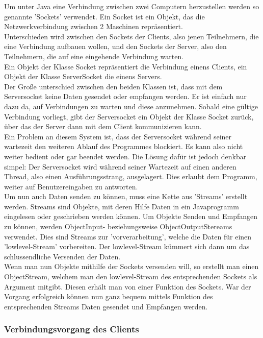 \documentclass[12pt,a4paper]{article}
\begin{document}
{Um unter Java eine Verbindung zwischen zwei Computern herzustellen werden so genannte 'Sockets' verwendet. Ein Socket ist ein Objekt, das die Netzwerkverbindung zwischen 2 Maschinen repräsentiert.\\
Unterschieden wird zwischen den Sockets der Clients, also jenen Teilnehmern, die eine Verbindung aufbauen wollen, und den Sockets der Server, also den Teilnehmern, die auf eine eingehende Verbindung warten.\\
Ein Objekt der Klasse Socket repräsentiert die Verbindung einens Clients, ein Objekt der Klasse ServerSocket die einens Servers.\\
Der Große unterschied zwischen den beiden Klassen ist, dass mit dem Serversocket keine Daten gesendet oder empfangen werden. Er ist einfach nur dazu da, auf  Verbindungen zu warten und diese anzunehmen. Sobald eine gültige Verbindung vorliegt, gibt der Serversocket ein Objekt der Klasse Socket zurück, über das der Server dann mit dem Client kommunizieren kann.\\[2ex]
Ein Problem an diesem System ist, dass der Serversocket während seiner wartezeit den weiteren Ablauf des Programmes blockiert. Es kann also nicht weiter bedient oder gar beendet werden. Die Lösung dafür ist jedoch denkbar simpel: Der Serversocket wird während seiner Wartezeit auf einen anderen Thread, also einen Ausführungsstrang, ausgelagert. Dies erlaubt dem Programm, weiter auf Benutzereingaben zu antworten.\\[3ex]
Um nun auch Daten senden zu können, muss eine Kette aus 'Streams' erstellt werden. Streams sind Objekte, mit deren Hilfe Daten in ein Javaprogramm eingelesen oder geschrieben werden können. 
Um Objekte Senden und Empfangen zu können, werden ObjectInput- beziehungsweise ObjectOutputStereams verwendet. Dies sind Streams zur 'vorverarbeitung', welche die Daten für einen 'lowlevel-Stream' vorbereiten. Der lowlevel-Stream kümmert sich dann um das schlussendliche Versenden der Daten. \\[2ex]
Wenn man nun Objekte mithilfe der Sockets versenden will, so erstellt man einen ObjectStream, welchem man den lowlevel-Stream des entsprechenden Sockets als Argument mitgibt. Diesen erhält man von einer Funktion des Sockets. War der Vorgang erfolgreich können nun ganz bequem mittels Funktion des entsprechenden Streams Daten gesendet und Empfangen werden.

\subsubsection{Verbindungsvorgang des Clients}
\label{SUBSUBSEC: CONCLI}

}
\end{document}
